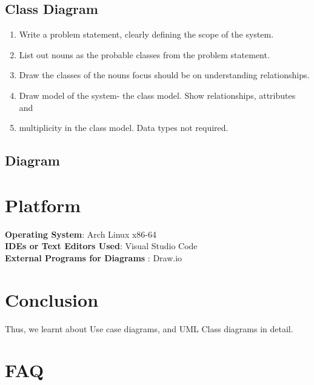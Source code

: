 \documentclass[11pt]{article}
\begin{document}
\subsection{Class Diagram}
\begin{enumerate}
	\item Write a problem statement, clearly defining the scope of the system.
	\item List out nouns as the probable classes from the problem statement.
	\item Draw the classes of the nouns focus should be on understanding relationships.
	\item Draw model of the system- the class model. Show relationships, attributes and
	\item multiplicity in the class model. Data types not required.
\end{enumerate}

\subsection{Diagram}


\section{Platform}
\textbf{Operating System}: Arch Linux x86-64 \\
\textbf{IDEs or Text Editors Used}: Visual Studio Code\\
\textbf{External Programs for Diagrams} : Draw.io\\


\section{Conclusion}
Thus, we learnt about Use case diagrams, and UML Class diagrams in detail.
\clearpage

\section{FAQ}
\end{document}
